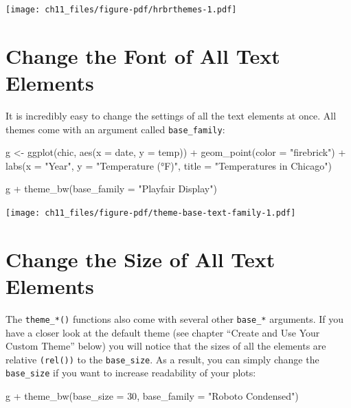 \documentclass[
  letterpaper,
  DIV=11,
  numbers=noendperiod]{scrreprt}
\newenvironment{Shaded}{\begin{snugshade}}{\end{snugshade}}
\newcommand{\AttributeTok}[1]{\textcolor[rgb]{0.40,0.45,0.13}{#1}}
\newcommand{\DecValTok}[1]{\textcolor[rgb]{0.68,0.00,0.00}{#1}}
\newcommand{\FunctionTok}[1]{\textcolor[rgb]{0.28,0.35,0.67}{#1}}
\newcommand{\NormalTok}[1]{\textcolor[rgb]{0.00,0.23,0.31}{#1}}
\newcommand{\OtherTok}[1]{\textcolor[rgb]{0.00,0.23,0.31}{#1}}
\newcommand{\SpecialCharTok}[1]{\textcolor[rgb]{0.37,0.37,0.37}{#1}}
\newcommand{\StringTok}[1]{\textcolor[rgb]{0.13,0.47,0.30}{#1}}
\begin{document}
\texttt{[image: ch11\_files/figure-pdf/hrbrthemes-1.pdf]}

\section{Change the Font of All Text
Elements}\label{change-the-font-of-all-text-elements}

It is incredibly easy to change the settings of all the text elements at
once. All themes come with an argument called \texttt{base\_family}:

\begin{Shaded}
\begin{Highlighting}[]
\NormalTok{g }\OtherTok{\textless{}{-}} \FunctionTok{ggplot}\NormalTok{(chic, }\FunctionTok{aes}\NormalTok{(}\AttributeTok{x =}\NormalTok{ date, }\AttributeTok{y =}\NormalTok{ temp)) }\SpecialCharTok{+}
  \FunctionTok{geom\_point}\NormalTok{(}\AttributeTok{color =} \StringTok{"firebrick"}\NormalTok{) }\SpecialCharTok{+}
  \FunctionTok{labs}\NormalTok{(}\AttributeTok{x =} \StringTok{"Year"}\NormalTok{, }\AttributeTok{y =} \StringTok{"Temperature (°F)"}\NormalTok{,}
       \AttributeTok{title =} \StringTok{"Temperatures in Chicago"}\NormalTok{)}

\NormalTok{g }\SpecialCharTok{+} \FunctionTok{theme\_bw}\NormalTok{(}\AttributeTok{base\_family =} \StringTok{"Playfair Display"}\NormalTok{)}
\end{Highlighting}
\end{Shaded}

\texttt{[image: ch11\_files/figure-pdf/theme-base-text-family-1.pdf]}

\section{Change the Size of All Text
Elements}\label{change-the-size-of-all-text-elements}

The \texttt{theme\_*()} functions also come with several other
\texttt{base\_*} arguments. If you have a closer look at the default
theme (see chapter ``Create and Use Your Custom Theme'' below) you will
notice that the sizes of all the elements are relative \texttt{(rel())}
to the \texttt{base\_size}. As a result, you can simply change the
\texttt{base\_size} if you want to increase readability of your plots:

\begin{Shaded}
\begin{Highlighting}[]
\NormalTok{g }\SpecialCharTok{+} \FunctionTok{theme\_bw}\NormalTok{(}\AttributeTok{base\_size =} \DecValTok{30}\NormalTok{, }\AttributeTok{base\_family =} \StringTok{"Roboto Condensed"}\NormalTok{)}
\end{Highlighting}
\end{Shaded}
\end{document}
